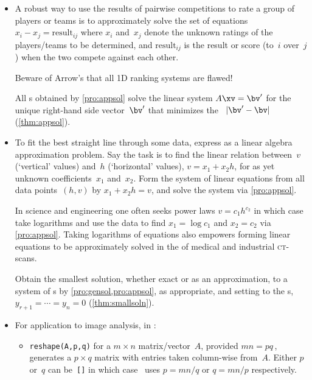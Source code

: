 \begin{itemize}
\item A robust way to use the results of pairwise competitions to rate a group of players or teams is to approximately solve the set of equations \(x_i-x_j=\text{result}_{ij}\) where \(x_i\) and~\(x_j\) denote the unknown ratings of the players\slash teams to be determined, and \(\text{result}_{ij}\) is the result or score (to~\(i\) over~\(j\)) when the two compete against each other.

Beware of Arrow's  that all 1D ranking systems are flawed!

\itemme All s obtained by \autoref{pro:appsol} solve the linear system \(A\xv=\bv'\) for the unique  right-hand side vector~\(\bv'\) that minimizes the ~\(|\bv'-\bv|\) (\autoref{thm:appsol}).

\item To fit the best straight line through some data, express as a linear algebra approximation problem.
Say the task is to find the linear relation between~\(v\) (`vertical' values) and~\(h\) (`horizontal' values), \(v=x_1+x_2h\), for as yet unknown coefficients~\(x_1\) and~\(x_2\).
Form the system of linear equations from all data points~\((h,v)\) by \(x_1+x_2h=v\), and solve the system via \autoref{pro:appsol}.

In science and engineering one often seeks power laws \(v=c_1h^{c_2}\) in which case take logarithms and use the data to find \(x_1=\log c_1\) and \(x_2=c_2\) via \autoref{pro:appsol}.
Taking logarithms of equations also empowers forming linear equations to be approximately solved in the  of medical and industrial \textsc{ct}-scans.


\itemhi Obtain the {smallest solution}, whether exact or as an approximation, to a system of s by \cref{pro:gensol,pro:appsol}, as appropriate, and setting to  the s, \(y_{r+1}=\cdots=y_n=0\) (\autoref{thm:smallsoln}).

\item For application to image analysis, in \script:
\begin{itemize}

\item {}\verb|reshape(A,p,q)| for a \(m\times n\) matrix\slash vector~\(A\), provided \(mn=pq\)\,, generates a \(p\times q\) matrix with entries taken column-wise from~\(A\).  
Either \(p\) or~\(q\) can be~\verb|[]| in which case \script\ uses \(p=mn/q\) or \(q=mn/p\) respectively.


\end{itemize}
\end{itemize}
